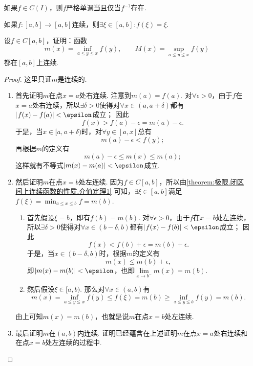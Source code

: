 \begin{corollary}
如果\(f \in C(I)\)，则\(f\)严格单调当且仅当\(f^{-1}\)存在.
\end{corollary}

\begin{corollary}
如果\(f\colon[a,b]\to[a,b]\)连续，则\(\exists\xi\in[a,b]: f(\xi)=\xi\).
\end{corollary}

\begin{example}
设\(f \in C[a,b]\)，证明：函数\[
m(x) = \inf\limits_{a \leq y \leq x} f(y), \qquad
M(x) = \sup\limits_{a \leq y \leq x} f(y)
\]都在\([a,b]\)上连续.
\begin{proof}
这里只证\(m\)是连续的.
\begin{enumerate}
\item 首先证明\(m\)在点\(x=a\)处右连续.
注意到\(m(a) = f(a)\).
对\(\forall\epsilon>0\)，由于\(f\)在\(x=a\)处右连续，所以\(\exists\delta>0\)使得对\(\forall x\in(a,a+\delta)\)都有\(\abs{f(x)-f(a)}<\epsilon\)成立；
因此\[
f(x)
> f(a) - \epsilon
= m(a) - \epsilon.
\]
于是，当\(x\in[a,a+\delta)\)时，对\(\forall y\in[a,x]\)总有\[
m(a) - \epsilon < f(y);
\]再根据\(m\)的定义有\[
m(a) - \epsilon \leq m(x) \leq m(a);
\]这样就有不等式\(\abs{m(x)-m(a)}<\epsilon\)成立.

\item 然后证明\(m\)在点\(x=b\)处左连续.
因为\(f \in C[a,b]\)，所以由\cref{theorem:极限.闭区间上连续函数的性质.介值定理1} 可知，\(\exists\xi\in[a,b]\)满足\(f(\xi) = \min_{a \leq x \leq b} f = m(b)\).
	\begin{enumerate}
	\item 首先假设\(\xi=b\)，即有\(f(b)=m(b)\).
	对\(\forall\epsilon>0\)，由于\(f\)在\(x=b\)处左连续，所以\(\exists\delta>0\)使得对\(\forall x\in(b-\delta,b)\)都有\(\abs{f(x)-f(b)}<\epsilon\)成立；
	因此\[
	f(x)
	< f(b) + \epsilon
	= m(b) + \epsilon.
	\]
	于是，当\(x\in(b-\delta,b)\)时，根据\(m\)的定义有\[
	m(x) \leq m(b) + \epsilon,
	\]
	即\(\abs{m(x)-m(b)}<\epsilon\)，也即\(\lim\limits_{x \to b^-} m(x) = m(b)\).

	\item 然后假设\(\xi\in[a,b)\).
	那么对\(\forall x\in(a,b)\)有\[
	m(x) = \inf\limits_{a \leq y \leq x} f(y)
	\leq f(\xi)
	= m(b)
	\geq \inf\limits_{a \leq y \leq b} f(y)
	= m(b).
	\]
	\end{enumerate}
	由上可知\(m(x) = m(b)\)，也就是说\(m\)在点\(x=b\)处左连续.

\item 最后证明\(m\)在\((a,b)\)内连续.
证明已经蕴含在上述证明\(m\)在点\(x=a\)处右连续和在点\(x=b\)处左连续的过程中.
\qedhere
\end{enumerate}
\end{proof}
\end{example}

